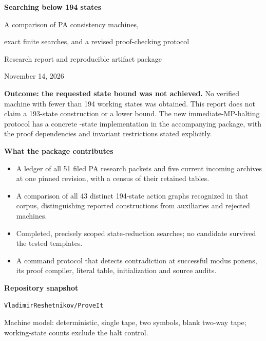\documentclass[11pt,letterpaper]{article}
\begin{document}
\hypersetup{pageanchor=false}
\begin{titlepage}
\vspace*{0.5in}
{\color{MidnightBlue}\Huge\bfseries Searching below 194 states\par}
\vspace{0.25in}
{\Large A comparison of PA consistency machines,\par
exact finite searches, and a revised proof-checking protocol\par}
\vspace{0.4in}
{\large Research report and reproducible artifact package\par}
November 14, 2026
\vspace{0.4in}

\begingroup
\setlength{\fboxsep}{12pt}
\colorbox{Apricot!25}{\parbox{0.93\linewidth}{
\textbf{Outcome: the requested state bound was not achieved.}
No verified machine with fewer than 194 working states was obtained.
This report does not claim a 193-state construction or a lower bound.
The new immediate-MP-halting protocol has a concrete
\prototypecount-state implementation in the accompanying package,
with the proof dependencies and invariant restrictions stated explicitly.
}}
\endgroup

\vspace{0.35in}
\textbf{What the package contributes}
\begin{itemize}
\item A ledger of all 51 filed PA research packets and five current incoming
archives at one pinned revision, with a census of their retained tables.
\item A comparison of all 43 distinct 194-state action graphs recognized
in that corpus, distinguishing reported constructions from auxiliaries
and rejected machines.
\item Completed, precisely scoped state-reduction searches; no candidate
survived the tested templates.
\item A command protocol that detects contradiction at successful modus
ponens, its proof compiler, literal table, initialization and source audits.
\end{itemize}

\vfill
\textbf{Repository snapshot}\par
\texttt{VladimirReshetnikov/ProveIt}\par
{}\par
\small
Machine model: deterministic, single tape, two symbols, blank two-way
tape; working-state counts exclude the halt control.
\end{titlepage}
\end{document}
